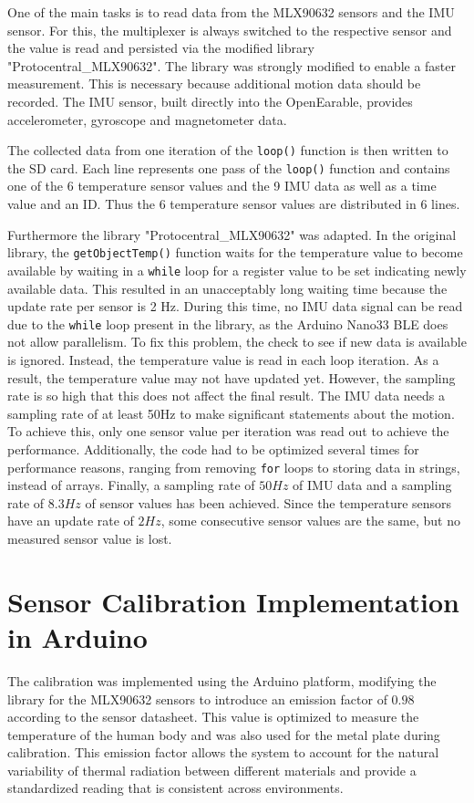 One of the main tasks is to read data from the MLX90632 sensors and the IMU sensor. 
For this, the multiplexer is always switched to the respective sensor and the value is read and persisted via the modified library "Protocentral\_MLX90632".
The library was strongly modified to enable a faster measurement. 
This is necessary because additional motion data should be recorded.
The IMU sensor, built directly into the OpenEarable, provides accelerometer, gyroscope and magnetometer data.

The collected data from one iteration of the \texttt{loop()} function is then written to the SD card. Each line represents one pass of the \texttt{loop()} function and contains one of the 6 temperature sensor values and the 9 IMU data as well as a time value and an ID.
Thus the 6 temperature sensor values are distributed in 6 lines. 

Furthermore the library "Protocentral\_MLX90632" was adapted. In the original library, the \texttt{getObjectTemp()} function waits for the temperature value to become available by waiting in a \texttt{while} loop for a register value to be set indicating newly available data. This resulted in an unacceptably long waiting time because the update rate per sensor is 2 Hz. 
During this time, no IMU data signal can be read due to the \texttt{while} loop present in the library, as the Arduino Nano33 BLE does not allow parallelism. 
To fix this problem, the check to see if new data is available is ignored. 
Instead, the temperature value is read in each loop iteration. 
As a result, the temperature value may not have updated yet. 
However, the sampling rate is so high that this does not affect the final result.
The IMU data needs a sampling rate of at least 50Hz to make significant statements about the motion. 
To achieve this, only one sensor value per iteration was read out to achieve the performance. 
Additionally, the code had to be optimized several times for performance reasons, ranging from removing \texttt{for} loops to storing data in strings, instead of arrays. 
Finally, a sampling rate of $50Hz$ of IMU data and a sampling rate of $8.3Hz$ of sensor values has been achieved.
Since the temperature sensors have an update rate of $2Hz$, some consecutive sensor values are the same, but no measured sensor value is lost.

\section{Sensor Calibration Implementation in Arduino}
The calibration was implemented using the Arduino platform, modifying the library for the MLX90632 sensors to introduce an emission factor of $0.98$ according to the sensor datasheet. 
This value is optimized to measure the temperature of the human body and was also used for the metal plate during calibration. 
This emission factor allows the system to account for the natural variability of thermal radiation between different materials and provide a standardized reading that is consistent across environments.

